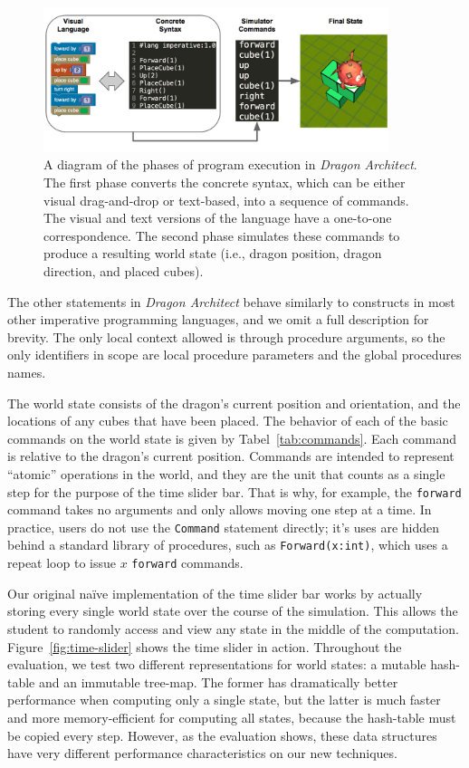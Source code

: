 \documentclass{sig-alternate}
\newcommand{\da}{\emph{Dragon Architect}}
\begin{document}
\begin{figure}[ht!]
  \centering
  \includegraphics[width=0.9\textwidth]{images/phases}
  \caption{A diagram of the phases of program execution in \da{}. The first phase converts the concrete syntax, which can be either visual drag-and-drop or text-based, into a sequence of commands. The visual and text versions of the language have a one-to-one correspondence. The second phase simulates these commands to produce a resulting world state (i.e., dragon position, dragon direction, and placed cubes).}
  \label{fig:phases}
\end{figure}

The other statements in \da{} behave similarly to constructs in most other imperative programming languages, and we omit a full description for brevity. The only local context allowed is through procedure arguments, so the only identifiers in scope are local procedure parameters and the global procedures names.

The world state consists of the dragon's current position and orientation, and the locations of any cubes that have been placed.  The behavior of each of the basic commands on the world state is given by Tabel~\ref{tab:commands}. Each command is relative to the dragon's current position. Commands are intended to represent ``atomic'' operations in the world, and they are the unit that counts as a single step for the purpose of the time slider bar. That is why, for example, the \texttt{forward} command takes no arguments and only allows moving one step at a time. In practice, users do not use the \texttt{Command} statement directly; it's uses are hidden behind a standard library of procedures, such as \texttt{Forward(x:int)}, which uses a repeat loop to issue $x$ \texttt{forward} commands.

Our original na\"{i}ve implementation of the time slider bar works by actually storing every single world state over the course of the simulation. This allows the student to randomly access and view any state in the middle of the computation. Figure~\ref{fig:time-slider} shows the time slider in action. Throughout the evaluation, we test two different representations for world states: a mutable hash-table and an immutable tree-map. The former has dramatically better performance when computing only a single state, but the latter is much faster and more memory-efficient for computing all states, because the hash-table must be copied every step. However, as the evaluation shows, these data structures have very different performance characteristics on our new techniques.
\end{document}
